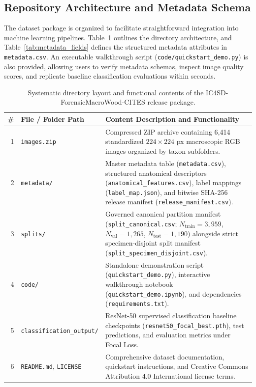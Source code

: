 \documentclass[a4paper,fleqn,12pt]{cas-sc}
\begin{document}
\subsection{Repository Architecture and Metadata Schema}

The dataset package is organized to facilitate straightforward integration into machine learning pipelines. Table~\ref{tab:repo_contents} outlines the directory architecture, and Table~\ref{tab:metadata_fields} defines the structured metadata attributes in \texttt{metadata.csv}. An executable walkthrough script (\texttt{code/quickstart\_demo.py}) is also provided, allowing users to verify metadata schemas, inspect image quality scores, and replicate baseline classification evaluations within seconds.

\begin{table}[pos=htbp]
\centering
\small
\setlength{\tabcolsep}{4pt}
\renewcommand{\arraystretch}{1.12}
\caption{Systematic directory layout and functional contents of the IC4SD-ForensicMacroWood-CITES release package.}
\label{tab:repo_contents}
\begin{tabularx}{\linewidth}{@{} r l X @{}}
\toprule
\textbf{\#} & \textbf{File / Folder Path} & \textbf{Content Description and Functionality} \\
\midrule
1 & \texttt{images.zip} & Compressed ZIP archive containing 6,414 standardized $224 \times 224$ px macroscopic RGB images organized by taxon subfolders. \\
2 & \texttt{metadata/} & Master metadata table (\texttt{metadata.csv}), structured anatomical descriptors (\texttt{anatomical\_features.csv}), label mappings (\texttt{label\_map.json}), and bitwise SHA-256 release manifest (\texttt{release\_manifest.csv}). \\
3 & \texttt{splits/} & Governed canonical partition manifest (\texttt{split\_canonical.csv}; $N_{\text{train}} = 3,959$, $N_{\text{val}} = 1,265$, $N_{\text{test}} = 1,190$) alongside strict specimen-disjoint split manifest (\texttt{split\_specimen\_disjoint.csv}). \\
4 & \texttt{code/} & Standalone demonstration script (\texttt{quickstart\_demo.py}), interactive walkthrough notebook (\texttt{quickstart\_demo.ipynb}), and dependencies (\texttt{requirements.txt}). \\
5 & \texttt{classification\_output/} & ResNet-50 supervised classification baseline checkpoints (\texttt{resnet50\_focal\_best.pth}), test predictions, and evaluation metrics under Focal Loss. \\
6 & \texttt{README.md}, \texttt{LICENSE} & Comprehensive dataset documentation, quickstart instructions, and Creative Commons Attribution 4.0 International license terms. \\
\bottomrule
\end{tabularx}
\end{table}
\end{document}
